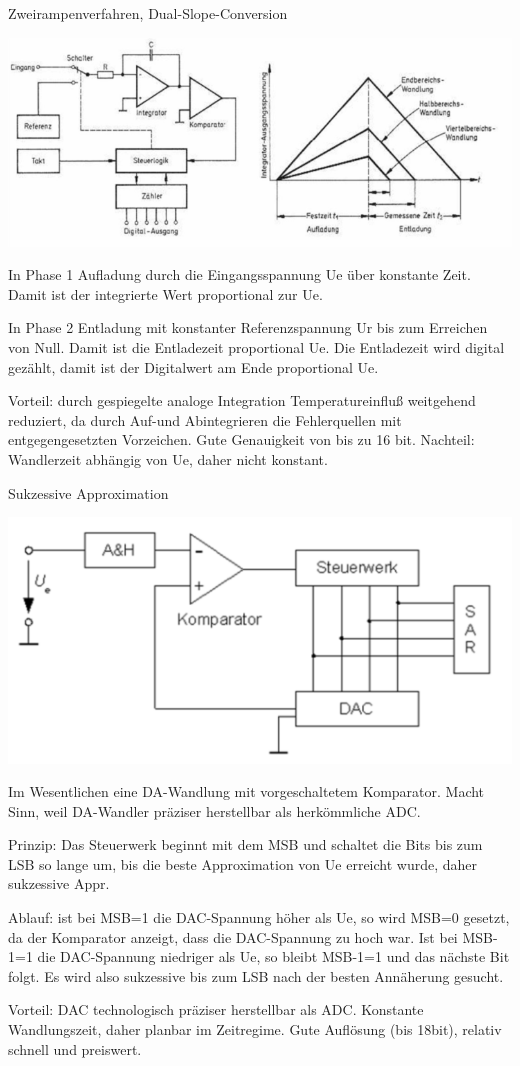 \documentclass[a4paper]{article}
\begin{document}
\begin{multicols}{3}
  Zweirampenverfahren, Dual-Slope-Conversion
  \begin{itemize*}
    \item \includegraphics[width=.5\linewidth]{Assets/Biosignalverarbeitung-Zweirampenverfahren.png}
    \item In Phase 1 Aufladung durch die Eingangsspannung Ue über konstante Zeit. Damit ist der integrierte Wert proportional zur Ue.
    \item In Phase 2 Entladung mit konstanter Referenzspannung Ur bis zum Erreichen von Null. Damit ist die Entladezeit proportional Ue. Die Entladezeit wird digital gezählt, damit ist der Digitalwert am Ende proportional Ue.
    \item Vorteil: durch gespiegelte analoge Integration Temperatureinfluß weitgehend reduziert, da durch Auf-und Abintegrieren die Fehlerquellen mit entgegengesetzten Vorzeichen. Gute Genauigkeit von bis zu 16 bit. Nachteil: Wandlerzeit abhängig von Ue, daher nicht konstant.
  \end{itemize*}

  Sukzessive Approximation

  \begin{itemize*}
    \item \includegraphics[width=.5\linewidth]{Assets/Biosignalverarbeitung-Sukzessive-Approximation.png}
    \item Im Wesentlichen eine DA-Wandlung mit vorgeschaltetem Komparator. Macht Sinn, weil DA-Wandler präziser herstellbar als herkömmliche ADC.
    \item Prinzip: Das Steuerwerk beginnt mit dem MSB und schaltet die Bits bis zum LSB so lange um, bis die beste Approximation von Ue erreicht wurde, daher sukzessive Appr.
    \item Ablauf: ist bei MSB=1 die DAC-Spannung höher als Ue, so wird MSB=0 gesetzt, da der Komparator anzeigt, dass die DAC-Spannung zu hoch war. Ist bei MSB-1=1 die DAC-Spannung niedriger als Ue, so bleibt MSB-1=1 und das nächste Bit folgt. Es wird also sukzessive bis zum LSB nach der besten Annäherung gesucht.
    \item Vorteil: DAC technologisch präziser herstellbar als ADC. Konstante Wandlungszeit, daher planbar im Zeitregime. Gute Auflösung (bis 18bit), relativ schnell und preiswert.
  \end{itemize*}


\end{multicols}
\end{document}
